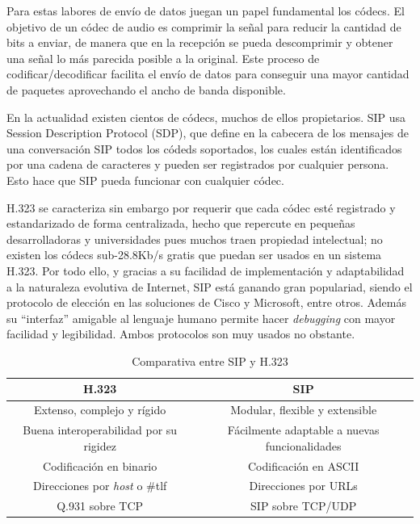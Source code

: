 \documentclass[a4paper, 12pt]{book}
\begin{document}
Para estas labores de envío de datos juegan un papel fundamental los códecs. El objetivo de un códec de audio es comprimir la señal para reducir la cantidad de bits a enviar, de manera que en la recepción se pueda descomprimir y obtener una señal lo más parecida posible a la original. Este proceso de codificar/decodificar facilita el envío de datos para conseguir una mayor cantidad de paquetes aprovechando el ancho de banda disponible.

En la actualidad existen cientos de códecs, muchos de ellos propietarios. SIP usa Session Description Protocol (SDP), que define en la cabecera de los mensajes de una conversación SIP todos los códeds soportados, los cuales están identificados por una cadena de caracteres y pueden ser registrados por cualquier persona. Esto hace que SIP pueda funcionar con cualquier códec.

H.323 se caracteriza sin embargo por requerir que cada códec esté registrado y estandarizado de forma centralizada, hecho que repercute en pequeñas desarrolladoras y universidades pues muchos traen propiedad intelectual; no existen los códecs sub-28.8Kb/s gratis que puedan ser usados en un sistema H.323. Por todo ello, y gracias a su facilidad de implementación y adaptabilidad a la naturaleza evolutiva de Internet, SIP está ganando gran populariad, siendo el protocolo de elección en las soluciones de Cisco y Microsoft, entre otros. Además su  ``interfaz'' amigable al lenguaje humano permite hacer \emph{debugging} con mayor facilidad y legibilidad.
Ambos protocolos son muy usados no obstante.
\\

\begin{table} [h]
  \begin{center}
    \begin{tabular}{| c | c |}
    \hline
    \textbf{H.323} & \textbf{SIP} \\ \hline
    Extenso, complejo y rígido & Modular, flexible y extensible\\\hline
    Buena interoperabilidad por su rigidez & Fácilmente adaptable a nuevas funcionalidades\\\hline
    Codificación en binario & Codificación en ASCII \\\hline
    Direcciones por \emph{host} o \#tlf & Direcciones por URLs \\ \hline
    Q.931 sobre TCP & SIP sobre TCP/UDP \\\hline
    \end{tabular}
    \label{tabla:SIPvsH.323}
    \caption{Comparativa entre SIP y H.323}
  \end{center}
\end{table}
\end{document}

